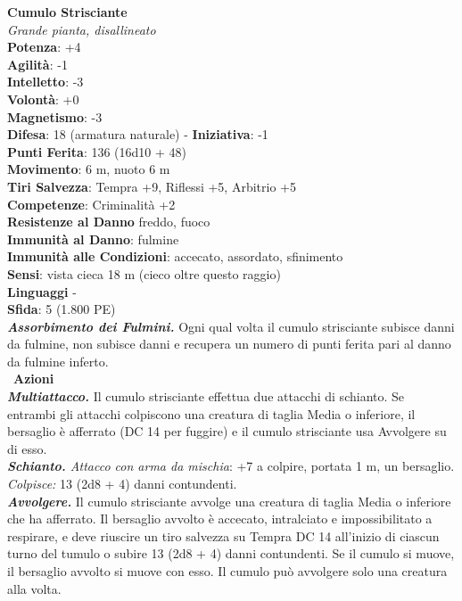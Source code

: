 \begin{multicols}{2}
\medskip\textbf{Cumulo Strisciante}\\
\emph{Grande pianta, disallineato}\\
\textbf{Potenza}: +4\\
\textbf{Agilità}: -1\\
\textbf{Intelletto}: -3\\
\textbf{Volontà}: +0\\
\textbf{Magnetismo}: -3\\
\textbf{Difesa}: 18 (armatura naturale) - \textbf{Iniziativa}: -1\\
\textbf{Punti Ferita}: 136 (16d10 + 48)\\
\textbf{Movimento}: 6 m, nuoto 6 m\\
\textbf{Tiri Salvezza}: Tempra +9, Riflessi +5, Arbitrio +5\\
\textbf{Competenze}: Criminalità +2\\
\textbf{Resistenze al Danno} freddo, fuoco\\
\textbf{Immunità al Danno}: fulmine\\
\textbf{Immunità alle Condizioni}: accecato, assordato, sfinimento\\
\textbf{Sensi}: vista cieca 18 m (cieco oltre questo raggio)\\
\textbf{Linguaggi} -\\
\textbf{Sfida}: 5 (1.800 PE)\smallskip\\
\emph{\textbf{Assorbimento dei Fulmini.}} Ogni qual volta il cumulo strisciante subisce danni da fulmine, non subisce danni e recupera un numero di punti ferita pari al danno da fulmine inferto.\\\
\smallskip\textbf{Azioni}\\
\emph{\textbf{Multiattacco.}} Il cumulo strisciante effettua due attacchi di schianto. Se entrambi gli attacchi colpiscono una creatura di taglia Media o inferiore, il bersaglio è afferrato (DC 14 per fuggire) e il cumulo strisciante usa Avvolgere su di esso.\\
\emph{\textbf{Schianto.} Attacco con arma da mischia}: +7 a colpire, portata 1 m, un bersaglio.\\
\emph{Colpisce:} 13 (2d8 + 4) danni contundenti.\\
\emph{\textbf{Avvolgere.}} Il cumulo strisciante avvolge una creatura di taglia Media o inferiore che ha afferrato. Il bersaglio avvolto è accecato, intralciato e impossibilitato a respirare, e deve riuscire un tiro salvezza su Tempra DC 14 all'inizio di ciascun turno del tumulo o subire 13 (2d8 + 4) danni contundenti. Se il cumulo si muove, il bersaglio avvolto si muove con esso. Il cumulo può avvolgere solo una creatura alla volta.\\

\end{multicols}
